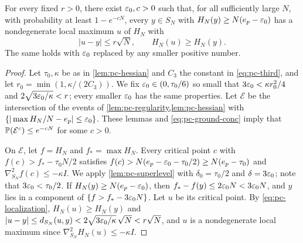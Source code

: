 \begin{proposition}\label{prop:pc-relocation}
For every fixed $r>0$, there exist $\varepsilon_0,c>0$ such that, for all sufficiently large $N$, with probability at least $1-e^{-cN}$, every $y\in S_N$ with $H_N(y)\ge N(e_p-\varepsilon_0)$ has a nondegenerate local maximum $u$ of $H_N$ with
\begin{equation}\label{eq:pc-relocation}
|u-y|\le r\sqrt N,\qquad H_N(u)\ge H_N(y).
\end{equation}
The same holds with $\varepsilon_0$ replaced by any smaller positive number.
\end{proposition}

\begin{proof}
Let $\tau_0,\kappa$ be as in \cref{lem:pc-hessian} and $C_3$ the constant in \eqref{eq:pc-third}, and let $r_0=\min(1,\kappa/(2C_3))$. We fix $\varepsilon_0\in(0,\tau_0/6)$ so small that $3\varepsilon_0<\kappa r_0^2/4$ and $2\sqrt{3\varepsilon_0/\kappa}<r$; every smaller $\varepsilon_0$ has the same properties. Let $\mathcal E$ be the intersection of the events of \cref{lem:pc-regularity,lem:pc-hessian} with $\{|\max H_N/N-e_p|\le\varepsilon_0\}$. These lemmas and \eqref{eq:pc-ground-conc} imply that $\mathbb P(\mathcal E^c)\le e^{-cN}$ for some $c>0$.

On $\mathcal E$, let $f=H_N$ and $f_*=\max H_N$. Every critical point $c$ with $f(c)>f_*-\tau_0N/2$ satisfies $f(c)>N(e_p-\varepsilon_0-\tau_0/2)\ge N(e_p-\tau_0)$ and $\nabla^2_{S_N}f(c)\le-\kappa I$. We apply \cref{lem:pc-superlevel} with $\delta_0=\tau_0/2$ and $\delta=3\varepsilon_0$; note that $3\varepsilon_0<\tau_0/2$. If $H_N(y)\ge N(e_p-\varepsilon_0)$, then $f_*-f(y)\le2\varepsilon_0N<3\varepsilon_0N$, and $y$ lies in a component of $\{f>f_*-3\varepsilon_0N\}$. Let $u$ be its critical point. By \eqref{eq:pc-localization}, $H_N(u)\ge H_N(y)$ and $|u-y|\le d_{S_N}(u,y)<2\sqrt{3\varepsilon_0/\kappa}\,\sqrt N<r\sqrt N$, and $u$ is a nondegenerate local maximum since $\nabla^2_{S_N}H_N(u)\le-\kappa I$.
\end{proof}

